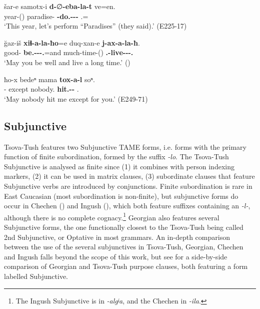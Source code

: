 \begin{exe}
	\ex\label{verbflex-ex08}
	\begin{xlist}
		
			\ex\label{verbflex-ex08a}
	\gll šar-e samotx-i \textbf{d-}∅\textbf{-eba-la-t} ve=en. \\
	year-{\Obl}({\Ess}) paradise-{\Pl} \textbf{{\D}-do.{\Pfv}-{\Imp}-{\Opt}-{\Pl}} {\Fpl}.{\Incl}={\Quot} \\
	\trans `This year, let's perform “Paradises” (they said).'
	\hfill (E225-17)
		

		
		\ex\label{verbflex-ex08b}
		\gll ğaz-iš \textbf{xiɬ-a-la-ħo}=e duq-xan-e \textbf{j-ax-a-la-ħ}. \\
		good-{\Adv} \textbf{be.{\Pfv}-{\Imp}-{\Opt}-{\Ssg}.{\Nom}}=and much-time-{\Obl}({\Ess}) \textbf{{\F}.{\Sg}-live-{\Imp}-{\Opt}-{\Ssg}.{\Nom}}\\
		\trans `May you be well and live a long time.'
		\hfill (\cite[182]{holiskygagua})
		
		\ex\label{verbflex-ex08c}
\gll ħo-x bedeⁿ mama \textbf{tox-a-l} soⁿ. \\
{\Ssg}-{\Cont} except nobody.{\Proh} \textbf{hit.{\Pfv}-{\Imp}-{\Opt}} {\Fsg}.{\Dat} \\
\trans `May nobody hit me except for you.'
\hfill (E249-71)		



		
	\end{xlist}
\end{exe}


\subsection{Subjunctive} \label{subj}

Tsova-Tush features two Subjunctive TAME forms, i.e. forms with the primary function of finite subordination, formed by the suffix \textit{-lo}. The Tsova-Tush Subjunctive is analysed as finite since (1) it combines with person indexing markers, (2) it can be used in matrix clauses, (3) subordinate clauses that feature Subjunctive verbs are introduced by conjunctions.
Finite subordination is rare in East Caucasian (most subordination is non-finite), but subjunctive forms do occur in Chechen (\cite{komen}) and Ingush (\cites[289]{nichols11}), which both feature suffixes containing an \textit{-l-}, although there is no complete cognacy.\footnote{The Ingush Subjunctive is in \textit{-algʲa}, and the Chechen in \textit{-ila}.} Georgian also features several Subjunctive forms, the one functionally closest to the Tsova-Tush being called 2nd Subjunctive, or Optative in most grammars. An in-depth comparison between the use of the several subjunctives in Tsova-Tush, Georgian, Chechen and Ingush falls beyond the scope of this work, but see  for a side-by-side comparison of Georgian and Tsova-Tush purpose clauses, both featuring a form labelled Subjunctive.


